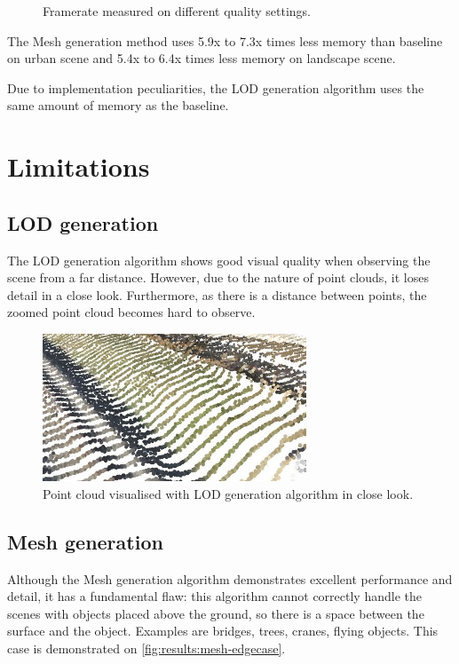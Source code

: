\begin{figure}[h]
    \caption{Framerate measured on different quality settings.}
    \label{fig:results:graph-mem}
\end{figure}

The Mesh generation method uses 5.9x to 7.3x times less memory than baseline on urban scene and 5.4x to 6.4x times less memory on landscape scene.

Due to implementation peculiarities, the LOD generation algorithm uses the same amount of memory as the baseline.

\section{Limitations}

\subsection{LOD generation}

The LOD generation algorithm shows good visual quality when observing the scene from a far distance. However, due to the nature of point clouds, it loses detail in a close look. Furthermore, as there is a distance between points, the zoomed point cloud becomes hard to observe.

\begin{figure}[h]
    \centering
    \includegraphics[width=0.7\textwidth]{lod-limitation.jpg}
    \caption{Point cloud visualised with LOD generation algorithm in close look.}
    \label{fig:results:lod-limitation}
\end{figure}

\subsection{Mesh generation}

Although the Mesh generation algorithm demonstrates excellent performance and detail, it has a fundamental flaw: this algorithm cannot correctly handle the scenes with objects placed above the ground, so there is a space between the surface and the object. Examples are bridges, trees, cranes, flying objects. This case is demonstrated on \autoref{fig:results:mesh-edgecase}.

